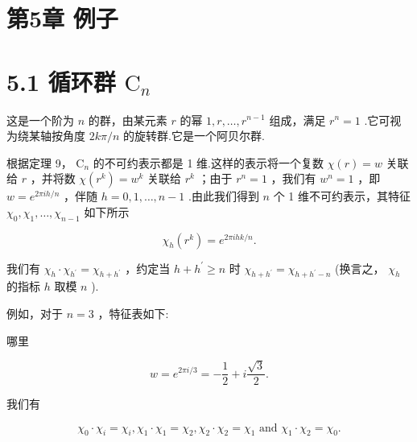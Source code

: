 \documentclass[10pt]{article}
\begin{document}
\section*{第5章 例子}

\section*{5.1 循环群 \({\mathrm{C}}_{n}\)}

这是一个阶为 \(n\) 的群，由某元素 \(r\) 的幂 \(1,r,\ldots ,{r}^{n - 1}\) 组成，满足 \({r}^{n} = 1\) .它可视为绕某轴按角度 \({2k\pi }/n\) 的旋转群.它是一个阿贝尔群.

根据定理 9， \({\mathrm{C}}_{n}\) 的不可约表示都是 1 维.这样的表示将一个复数 \(\chi \left( r\right)  = w\) 关联给 \(r\) ，并将数 \(\chi \left( {r}^{k}\right)  = {w}^{k}\) 关联给 \({r}^{k}\) ；由于 \({r}^{n} = 1\) ，我们有 \({w}^{n} = 1\) ，即 \(w = {e}^{{2\pi ih}/n}\) ，伴随 \(h = 0,1,\ldots ,n - 1\) .由此我们得到 \(n\) 个 1 维不可约表示，其特征 \({\chi }_{0},{\chi }_{1},\ldots ,{\chi }_{n - 1}\) 如下所示

\[
{\chi }_{h}\left( {r}^{k}\right)  = {e}^{{2\pi ihk}/n}.
\]

我们有 \({\chi }_{h} \cdot  {\chi }_{{h}^{\prime }} = {\chi }_{h + {h}^{\prime }}\) ，约定当 \(h + {h}^{\prime } \geq  n\) 时 \({\chi }_{h + {h}^{\prime }} = {\chi }_{h + {h}^{\prime } - n}\) (换言之， \({\chi }_{h}\) 的指标 \(h\) 取模 \(n\) ).

例如，对于 \(n = 3\) ，特征表如下:

\begin{center}
\end{center}

哪里

\[
w = {e}^{{2\pi i}/3} =  - \frac{1}{2} + i\frac{\sqrt{3}}{2}.
\]

我们有

\[
{\chi }_{0} \cdot  {\chi }_{i} = {\chi }_{i},{\chi }_{1} \cdot  {\chi }_{1} = {\chi }_{2},{\chi }_{2} \cdot  {\chi }_{2} = {\chi }_{1}\text{ and }{\chi }_{1} \cdot  {\chi }_{2} = {\chi }_{0}.
\]
\end{document}
